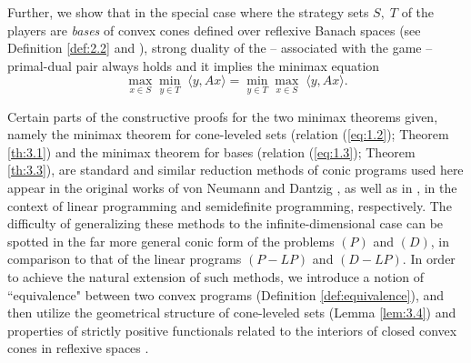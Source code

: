\documentclass[11pt, twoside]{article}
\numberwithin{equation}{section}
\theoremstyle{definition}
\begin{document}
Further, we show that in the special case where the strategy sets $S,\;T$ of the players are \textit{bases} of convex cones defined over reflexive Banach spaces (see Definition \ref{def:2.2} and \cite{casini2010cones}), strong duality of the -- associated with the game -- primal-dual pair always holds and it implies the minimax equation\vspace{0.2cm}
\begin{equation}\label{eq:1.3}
    \max_{x\in S}\min_{y\in T}\;\langle y,Ax\rangle=\min_{y\in T}\max_{x\in S}\;\langle y,Ax\rangle.
\end{equation}


Certain parts of the constructive proofs for the two minimax theorems given, namely the minimax theorem for cone-leveled sets (relation (\ref{eq:1.2}); Theorem \ref{th:3.1}) and the minimax theorem for bases (relation (\ref{eq:1.3}); Theorem \ref{th:3.3}), are standard and similar reduction methods of conic programs used here appear in the original works of von Neumann \cite{VonNeumann1944-VONTOG-4} and Dantzig \cite{dantzig1956constructive, dantzig2016linear}, as well as in \cite{ickstadt2024semidefinite}, in the context of linear programming and semidefinite programming, respectively. The difficulty of generalizing these methods to the infinite-dimensional case can be spotted in the far more general conic form of the problems \hyperlink{primal}{$(P)$} and \hyperlink{dual}{$(D)$}, in comparison to that of the linear programs \hyperlink{LPI}{$(P-LP)$} and \hyperlink{LPII}{$(D-LP)$}. In order to achieve the natural extension of such methods, we introduce a notion of ``equivalence" between two convex programs (Definition \ref{def:equivalence}), and then utilize the geometrical structure of cone-leveled sets (Lemma \ref{lem:3.4}) and properties of strictly positive functionals related to the interiors of closed convex cones in reflexive spaces \cite[Theorem 3.6]{casini2010cones}.\par
\end{document}
